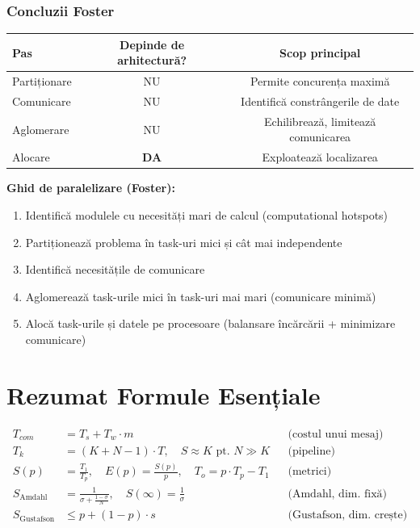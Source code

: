 \documentclass[a4paper,11pt]{article}
\newcommand{\thead}[1]{\cellcolor{tblh}\color{white}\textbf{#1}}
\begin{document}
\subsubsection{Concluzii Foster}

\begin{center}
\begin{tabular}{lcc}
\toprule
\thead{Pas} & \thead{Depinde de arhitectură?} & \thead{Scop principal} \\
\midrule
Partiționare & NU & Permite concurența maximă \\
Comunicare & NU & Identifică constrângerile de date \\
Aglomerare & NU & Echilibrează, limitează comunicarea \\
Alocare & \textbf{DA} & Exploatează localizarea \\
\bottomrule
\end{tabular}
\end{center}

\textbf{Ghid de paralelizare (Foster):}
\begin{enumerate}[noitemsep]
  \item Identifică modulele cu necesități mari de calcul (computational hotspots)
  \item Partiționează problema în task-uri mici și cât mai independente
  \item Identifică necesitățile de comunicare
  \item Aglomerează task-urile mici în task-uri mai mari (comunicare minimă)
  \item Alocă task-urile și datele pe procesoare (balansare încărcării + minimizare comunicare)
\end{enumerate}

\section*{Rezumat Formule Esențiale}

\begin{formulabox}
\begin{align*}
T_{com} &= T_s + T_w \cdot m & &\text{(costul unui mesaj)} \\[4pt]
T_k &= (K + N - 1) \cdot T, \quad S \approx K \text{ pt. } N\gg K & &\text{(pipeline)} \\[4pt]
S(p) &= \frac{T_1}{T_p}, \quad E(p) = \frac{S(p)}{p}, \quad T_o = p\cdot T_p - T_1 & &\text{(metrici)} \\[4pt]
S_\text{Amdahl} &= \frac{1}{\sigma + \frac{1-\sigma}{N}}, \quad S(\infty) = \frac{1}{\sigma} & &\text{(Amdahl, dim. fixă)} \\[4pt]
S_\text{Gustafson} &\leq p + (1-p)\cdot s & &\text{(Gustafson, dim. crește)}
\end{align*}
\end{formulabox}
\end{document}
